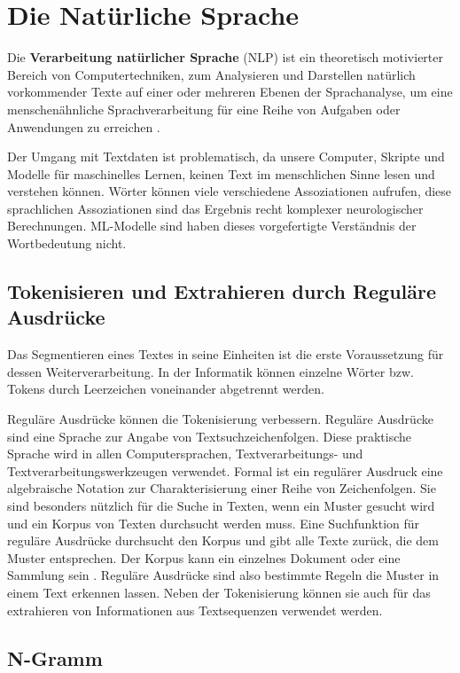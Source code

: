 \chapter{Die Natürliche Sprache}


Die \textbf{Verarbeitung natürlicher Sprache} (NLP) ist ein theoretisch motivierter Bereich von Computertechniken, zum Analysieren und Darstellen natürlich vorkommender Texte auf einer oder mehreren Ebenen der Sprachanalyse, um eine menschenähnliche Sprachverarbeitung für eine Reihe von Aufgaben oder Anwendungen zu erreichen \cite*{Liddy}.

Der Umgang mit Textdaten ist problematisch, da unsere Computer, Skripte und Modelle für maschinelles Lernen, keinen Text im menschlichen Sinne lesen und verstehen können. Wörter können viele verschiedene Assoziationen aufrufen, diese sprachlichen Assoziationen sind das Ergebnis recht komplexer neurologischer Berechnungen. ML-Modelle sind haben dieses vorgefertigte Verständnis der Wortbedeutung nicht.



\section{Tokenisieren und Extrahieren durch Reguläre Ausdrücke}
Das Segmentieren eines Textes in seine Einheiten ist die erste Voraussetzung für dessen Weiterverarbeitung. In der Informatik können einzelne Wörter bzw. Tokens durch Leerzeichen voneinander abgetrennt werden.

Reguläre Ausdrücke können die Tokenisierung verbessern. Reguläre Ausdrücke sind eine Sprache zur Angabe von Textsuchzeichenfolgen. Diese praktische Sprache wird in allen Computersprachen, Textverarbeitungs- und Textverarbeitungswerkzeugen verwendet. Formal ist ein regulärer Ausdruck eine algebraische Notation zur Charakterisierung einer Reihe von Zeichenfolgen. Sie sind besonders nützlich für die Suche in Texten, wenn ein Muster gesucht wird und ein Korpus von Texten durchsucht werden muss. Eine Suchfunktion für reguläre Ausdrücke durchsucht den Korpus und gibt alle Texte zurück, die dem Muster entsprechen. Der Korpus kann ein einzelnes Dokument oder eine Sammlung sein \cite*[3]{Jurafskya}. Reguläre Ausdrücke sind also bestimmte Regeln die Muster in einem Text erkennen lassen. Neben der Tokenisierung können sie auch für das extrahieren von Informationen aus Textsequenzen verwendet werden.

\section{N-Gramm}

